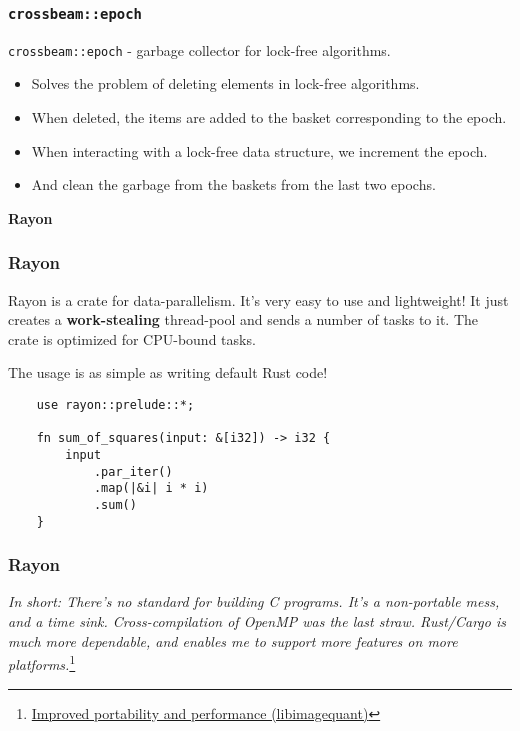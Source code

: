 \documentclass[aspectratio=1610,t]{beamer}
\begin{document}

\begin{frame}[fragile]
\frametitle{\texttt{crossbeam::epoch}}
\texttt{crossbeam::epoch} - garbage collector for lock-free algorithms.
\begin{itemize} 
    \item<2-> Solves the problem of deleting elements in lock-free algorithms.
    \item<3-> When deleted, the items are added to the basket corresponding to the epoch.
    \item<4-> When interacting with a lock-free data structure, we increment the epoch.
    \item<5-> And clean the garbage from the baskets from the last two epochs.
\end{itemize}
\end{frame}


\begin{frame}[c]
\centering\Huge\textbf{Rayon}
\end{frame}


\begin{frame}[fragile]
\frametitle{Rayon}
Rayon is a crate for data-parallelism. It's very easy to use and lightweight! It just creates a \textbf{work-stealing} thread-pool and sends a number of tasks to it. The crate is optimized for CPU-bound tasks.

The usage is as simple as writing default Rust code!

\begin{verbatim}
    use rayon::prelude::*;

    fn sum_of_squares(input: &[i32]) -> i32 {
        input
            .par_iter()
            .map(|&i| i * i)
            .sum()
    }
\end{verbatim}
\end{frame}


\begin{frame}[fragile]
\frametitle{Rayon}
\textit{In short: There's no standard for building C programs. It's a non-portable mess, and a time sink. Cross-compilation of OpenMP was the last straw. Rust/Cargo is much more dependable, and enables me to support more features on more platforms.}\footnote{\href{https://pngquant.org/rust.html}{Improved portability and performance (libimagequant)}}

\end{frame}
\end{document}
